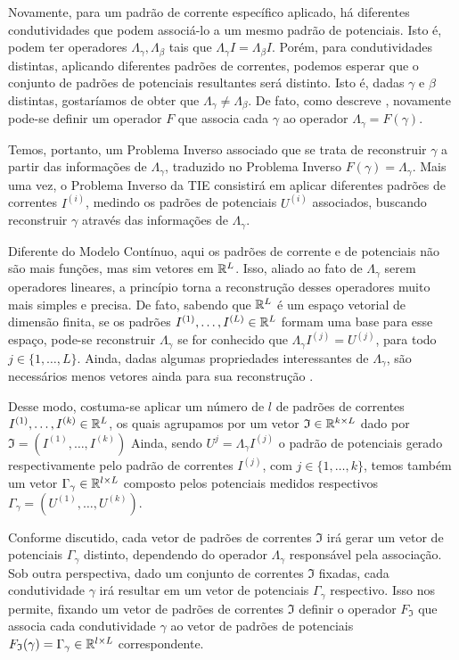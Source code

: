 Novamente, para um padrão de corrente específico aplicado, há diferentes condutividades que podem associá-lo a um mesmo padrão de potenciais. Isto é, podem ter operadores $\Lambda_\gamma,\Lambda_\beta$ tais que $\Lambda_\gamma I = \Lambda_\beta I$. Porém, para condutividades distintas, aplicando diferentes padrões de correntes, podemos esperar que o conjunto de padrões de potenciais resultantes será distinto. Isto é, dadas $\gamma$ e $\beta$ distintas, gostaríamos de obter que $\Lambda_\gamma \neq \Lambda_\beta$. De fato, como descreve , novamente pode-se definir um operador $F$
que associa cada $\gamma$ ao operador $\Lambda_\gamma = F(\gamma)$.


Temos, portanto, um Problema Inverso associado que se trata de reconstruir $\gamma$ a partir das informações de $\Lambda_\gamma$, traduzido no Problema Inverso $F(\gamma) = \Lambda_\gamma$. Mais uma vez, o Problema Inverso da TIE consistirá em aplicar diferentes padrões de correntes $I^{(i)}$, medindo os padrões de potenciais $U^{(i)}$ associados, buscando reconstruir $\gamma$ através das informações de $\Lambda_\gamma$.

Diferente do Modelo Contínuo, aqui os padrões de corrente e de potenciais não são mais funções, mas sim vetores em $\mathbb{R}^L$. Isso, aliado ao fato de $\Lambda_\gamma$ serem operadores lineares, a princípio torna a reconstrução desses operadores muito mais simples e precisa. De fato, sabendo que $\mathbb{R}^L$ é um espaço vetorial de dimensão finita, se os padrões $I^{(1)},\dots, I^{(L)}\in \mathbb{R}^L$ formam uma base para esse espaço, pode-se reconstruir $\Lambda_\gamma$ se for conhecido que $\Lambda_\gamma I^{(j)} = U^{(j)}$, para todo $j \in \{1,\dots,L\}$. Ainda, dadas algumas propriedades interessantes de $\Lambda_\gamma$, são necessários menos vetores ainda para sua reconstrução \cite{margotti}.

Desse modo, costuma-se aplicar um número de $l$ de padrões de correntes $I^{(1)},\dots,I^{(k)}\in \mathbb{R}^L$, os quais agrupamos por um vetor $\mathfrak I \in \mathbb{R}^{k\times L}$ dado por $\mathfrak I = (I^{(1)},\dots,I^{(k)})$ Ainda, sendo $U^{j} = \Lambda_\gamma I^{(j)}$ o padrão de potenciais gerado respectivamente pelo padrão de correntes $I^{(j)}$, com $j\in \{1,\dots,k\}$, temos também um vetor $\Gamma_\gamma \in \mathbb{R}^{l \times L}$ composto pelos potenciais medidos respectivos $ \Gamma_\gamma = (U^{(1)},\dots,U^{(k)})$.

Conforme discutido, cada vetor de padrões de correntes $\mathfrak I$ irá gerar um vetor de potenciais $\Gamma_\gamma$ distinto, dependendo do operador $\Lambda_\gamma$ responsável pela associação. Sob outra perspectiva, dado um conjunto de correntes $\mathfrak I$ fixadas, cada condutividade $\gamma$ irá resultar em um vetor de potenciais $\Gamma_\gamma$ respectivo.  Isso nos permite, fixando um vetor de padrões de correntes $\mathfrak I$  definir o operador $F_{\mathfrak I}$ que associa cada condutividade $\gamma$ ao vetor de padrões de potenciais $F_{\mathfrak I}(\gamma) = \Gamma_\gamma \in \mathbb{R}^{l \times L}$ correspondente.

